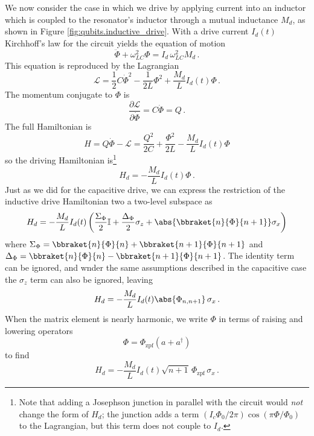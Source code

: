 We now consider the case in which we drive by applying current into an inductor which is coupled to the resonator's inductor through a mutual inductance $M_d$, as shown in Figure \ref{fig:qubits.inductive_drive}.
With a drive current $I_d(t)$ Kirchhoff's law for the circuit yields the equation of motion
\begin{equation}
  \ddot{\Phi} + \omega_{LC}^2 \Phi = I_d \, \omega_{LC}^2 M_d \, .
\end{equation}
This equation is reproduced by the Lagrangian
\begin{equation}
  \mathcal{L} = \frac{1}{2}C \dot{\Phi}^2 - \frac{1}{2L} \Phi^2 + \frac{M_d}{L}I_d(t) \Phi \, .
\end{equation}
The momentum conjugate to $\Phi$ is
\begin{equation*}
  \frac{\partial \mathcal{L}}{\partial \dot{\Phi}} = C \dot{\Phi} = Q \, .
\end{equation*}
The full Hamiltonian is
\begin{equation*}
  H
  = Q \dot{\Phi} - \mathcal{L}
  = \frac{Q^2}{2C} + \frac{\Phi^2}{2L} - \frac{M_d}{L} I_d(t) \Phi
\end{equation*}
so the driving Hamiltonian is\footnote{Note that adding a Josephson junction in parallel with the circuit would \emph{not} change the form of $H_d$; the junction adds a term $(I_c \Phi_0 / 2\pi)\cos(\pi \Phi / \Phi_0)$ to the Lagrangian, but this term does not couple to $I_d$.}
\begin{equation*}
  H_d = - \frac{M_d}{L}I_d(t) \Phi \, .
\end{equation*}
Just as we did for the capacitive drive, we can express the restriction of the inductive drive Hamiltonian two a two-level subspace as
\begin{equation*}
  H_d = -\frac{M_d}{L} I_d(t) \left(
      \frac{\Sigma_\Phi}{2} \mathbb{I}
    + \frac{\Delta_\Phi}{2} \sigma_z
    + \abs{\bbraket{n}{\Phi}{n+1}} \sigma_x
  \right)
\end{equation*}
where $\Sigma_\Phi = \bbraket{n}{\Phi}{n} + \bbraket{n+1}{\Phi}{n+1}$ and $\Delta_\Phi = \bbraket{n}{\Phi}{n} - \bbraket{n+1}{\Phi}{n+1}$.
The identity term can be ignored, and wnder the same assumptions described in the capacitive case the $\sigma_z$ term can also be ignored, leaving
\begin{equation}
  H_d = - \frac{M_d}{L} I_d(t) \abs{\Phi_{n,n+1}} \, \sigma_x \, .
\end{equation}
When the matrix element is nearly harmonic, we write $\Phi$ in terms of raising and lowering operators
\begin{equation*}
  \Phi = \Phi_\text{zpf} (a + a^\dagger)
\end{equation*}
to find
\begin{equation*}
  H_d = - \frac{M_d}{L} I_d(t) \sqrt{n+1} \, \Phi_\text{zpf} \, \sigma_x
  \, .
\end{equation*}
